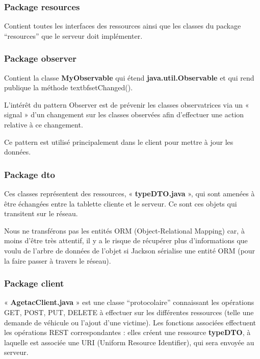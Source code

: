 \documentclass{article}
\begin{document}
\newpage

\subsubsection{Package resources}

Contient toutes les interfaces des ressources ainsi que les classes du package “resources” que le serveur doit implémenter.

\subsubsection{Package observer}

Contient la classe \textbf{MyObservable} qui étend \textbf{java.util.Observable} et qui rend publique la méthode textbf{setChanged()}.

L'intérêt du pattern Observer est de prévenir les classes observatrices via un « signal » d'un changement sur les classes observées afin d'effectuer une action relative à ce changement.

Ce pattern est utilisé principalement dans le client pour mettre à jour les données.

\subsubsection{Package dto}

Ces classes représentent des ressources, « \textbf{typeDTO.java} », qui sont amenées à être échangées entre la tablette cliente et le serveur. Ce sont ces objets qui transitent sur le réseau.

Nous ne transférons pas les entités ORM (Object-Relational Mapping) car, à moins d’être très attentif, il y a le risque de récupérer plus d’informations que voulu de l’arbre de données de l’objet si Jackson sérialise une entité ORM (pour la faire passer à travers le réseau).

\subsubsection{Package client}

« \textbf{AgetacClient.java} » est une classe “protocolaire” connaissant les opérations GET, POST, PUT, DELETE à effectuer sur les différentes ressources (telle une demande de véhicule ou l'ajout d'une victime). Les fonctions associées effectuent les opérations REST correspondantes : elles créent une ressource \textbf{typeDTO}, à laquelle est associée une URI (Uniform Resource Identifier), qui sera envoyée au serveur.
\end{document}
